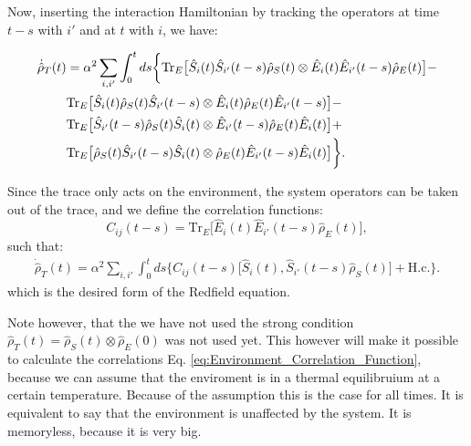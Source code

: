 Now, inserting the interaction Hamiltonian by tracking the operators at time $t - s$ with $i'$ and at $t$ with $i$, we have:

\begin{align}
	\dot{\hat{\rho}}_T(t) & = \alpha^2  \sum_{i, i'} \int_0^t ds
	\bigg\{
	\mathrm{Tr}_E \big[ \hat{S}_i(t) \hat{S}_{i'}(t-s) \hat{\rho}_S(t)      \otimes   \hat{E}_{i}(t) \hat{E}_{i'}(t-s) \hat{\rho}_E(t)  \big] -  \notag                         \\
	                      & \mathrm{Tr}_E \big[ \hat{S}_i(t) \hat{\rho}_S(t) \hat{S}_{i'}(t-s)      \otimes   \hat{E}_{i}(t) \hat{\rho}_E(t) \hat{E}_{i'}(t-s)  \big] - \notag  \\
	                      & \mathrm{Tr}_E \big[ \hat{S}_{i'}(t-s) \hat{\rho}_S(t) \hat{S}_i(t)      \otimes   \hat{E}_{i'}(t-s) \hat{\rho}_E(t) \hat{E}_{i}(t)  \big] +  \notag \\
	                      & \mathrm{Tr}_E \big[ \hat{\rho}_S(t) \hat{S}_{i'}(t-s) \hat{S}_i(t)      \otimes   \hat{\rho}_E(t) \hat{E}_{i'}(t-s) \hat{E}_{i}(t)  \big]
	\bigg\}.
	\label{eq:Interaction_Hamiltonian_Expansion}
\end{align}

Since the trace only acts on the environment, the system operators can be taken out of the trace, and we define the correlation functions:
\begin{equation}
	C_{ij}(t - s) = \mathrm{Tr}_E \big[\hat{E}_{i}(t) \hat{E}_{i'}(t-s) \hat{\rho}_E(t)\big],
	\label{eq:Environment_Correlation_Function}
\end{equation}
such that:
\begin{align}
	\dot{\hat{\rho}}_T(t) = \alpha^2  \sum_{i, i'} \int_0^t ds
	\bigg\{
	C_{ij}(t - s) \big[ \hat{S}_i(t),  \hat{S}_{i'}(t-s) \hat{\rho}_S(t) \big] + \text{H.c.}
	\bigg\}.
	\label{eq:Redfield_Equation_Final}
\end{align}
which is the desired form of the Redfield equation.

Note however, that the we have not used the strong condition $\hat{\rho}_T(t) = \hat{\rho}_S(t) \otimes \hat{\rho}_E(0)$ was not used yet.
This however will make it possible to calculate the correlations Eq. \eqref{eq:Environment_Correlation_Function}, because we can assume that the enviroment is in a thermal equilibruium at a certain temperature.
Because of the assumption this is the case for all times.
It is equivalent to say that the environment is unaffected by the system. It is memoryless, because it is very big.
